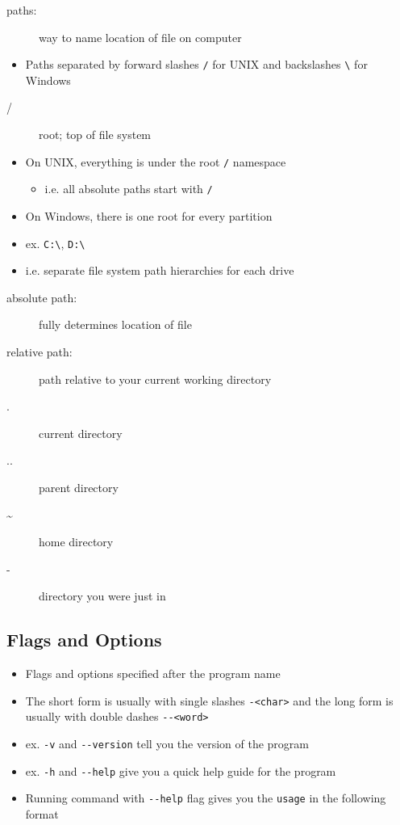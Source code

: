 \documentclass[letterpaper,12pt]{article}
\begin{document}
\begin{description}
 \item[paths:] way to name location of file on computer
\end{description}

\begin{itemize}
 \item Paths separated by forward slashes \lstinline{/} for UNIX and backslashes \lstinline{\} for Windows
\end{itemize}

\begin{description}
 \item[/] root; top of file system
\end{description}

\begin{itemize}
 \item On UNIX, everything is under the root \lstinline{/} namespace
       \begin{itemize}
        \item i.e. all absolute paths start with \lstinline{/}
       \end{itemize}
 \item On Windows, there is one root for every partition
 \item ex. \lstinline{C:\}, \lstinline{D:\}
 \item i.e. separate file system path hierarchies for each drive
\end{itemize}

\begin{description}
 \item[absolute path:] fully determines location of file
 \item[relative path:] path relative to your current working directory
 \item[.] current directory
 \item[..] parent directory
 \item[\textasciitilde] home directory
 \item[-] directory you were just in
\end{description}

\subsection{Flags and Options}

\begin{itemize}
 \item Flags and options specified after the program name
 \item The short form is usually with single slashes \lstinline{-<char>} and the long form is usually with double dashes \lstinline{--<word>}
 \item ex. \lstinline{-v} and \lstinline{--version} tell you the version of the program
 \item ex. \lstinline{-h} and \lstinline{--help} give you a quick help guide for the program
 \item Running command with \lstinline{--help} flag gives you the \lstinline{usage} in the following format
\end{itemize}
\end{document}
